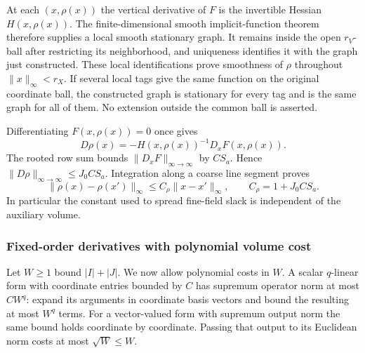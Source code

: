 At each $(x,\rho(x))$ the vertical derivative of $F$ is the
invertible Hessian $H(x,\rho(x))$. The finite-dimensional smooth
implicit-function theorem therefore supplies a local smooth
stationary graph. It remains inside the open $r_V$-ball after
restricting its neighborhood, and uniqueness identifies it with
the graph just constructed. These local identifications prove
smoothness of $\rho$ throughout $\|x\|_\infty<r_X$.
If several local tags give the same function on the original
coordinate ball, the constructed graph is stationary for every
tag and is the same graph for all of them. No extension outside
the common ball is asserted.

Differentiating $F(x,\rho(x))=0$ once gives
\[
        D\rho(x)=-H(x,\rho(x))^{-1}D_xF(x,\rho(x)).
\]
The rooted row sum bounds $\|D_xF\|_{\infty\to\infty}$ by
$CS_a$. Hence $\|D\rho\|_{\infty\to\infty}\le J_0CS_a$.
Integration along a coarse line segment proves
\begin{equation}\label{eq:stationary-uniform-lipschitz}
 \|\rho(x)-\rho(x')\|_\infty
              \le C_\rho\|x-x'\|_\infty,\qquad C_\rho=1+J_0CS_a.
\end{equation}
In particular the constant used to spread fine-field slack is
independent of the auxiliary volume.

\subsubsection{Fixed-order derivatives with polynomial volume cost}
Let $W\ge1$ bound $|I|+|J|$. We now allow polynomial costs in $W$.
A scalar $q$-linear form with coordinate entries bounded by $C$
has supremum operator norm at most $CW^q$: expand its arguments
in coordinate basis vectors and bound the resulting at most $W^q$
terms. For a vector-valued form with supremum output norm the same
bound holds coordinate by coordinate. Passing that output to its
Euclidean norm costs at most $\sqrt W\le W$.

